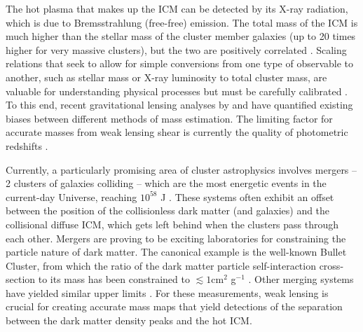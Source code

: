 The hot plasma that makes up the \ac{ICM} can be detected by its X-ray radiation, which is due to Bremsstrahlung (free-free) emission. The total mass of the \ac{ICM} is much higher than the stellar mass of the cluster member galaxies (up to 20 times higher for very massive clusters), but the two are positively correlated \citep{Kravtsov12}. Scaling relations that seek to allow for simple conversions from one type of observable to another, such as stellar mass or X-ray luminosity to total cluster mass, are valuable for understanding physical processes but must be carefully calibrated \citep{Leauthaud10}. To this end, recent gravitational lensing analyses by \citet{Applegate14} and \citet{Hoekstra15} have quantified existing biases between different methods of mass estimation. The limiting factor for accurate masses from weak lensing shear is currently the quality of photometric redshifts \citep{Hoekstra15}.




Currently, a particularly promising area of cluster astrophysics involves mergers -- 2 clusters of galaxies colliding -- which are the most energetic events in the current-day Universe, reaching $10^{58}$ J \citep{Markevitch07}. These systems often exhibit an offset between the position of the collisionless dark matter (and galaxies) and the collisional diffuse \ac{ICM}, which gets left behind when the clusters pass through each other. Mergers are proving to be exciting laboratories for constraining the particle nature of dark matter. The canonical example is the well-known Bullet Cluster, from which the ratio of the dark matter particle self-interaction cross-section to its mass has been constrained to $\lesssim 1 $cm$^2$ g$^{-1}$ \citep{Markevitch04}. Other merging systems have yielded similar upper limits \citep[see e.g.][]{Clowe12,Bradac08}. For these measurements, weak lensing is crucial for creating accurate mass maps that yield detections of the separation between the dark matter density peaks and the hot \ac{ICM}. %

